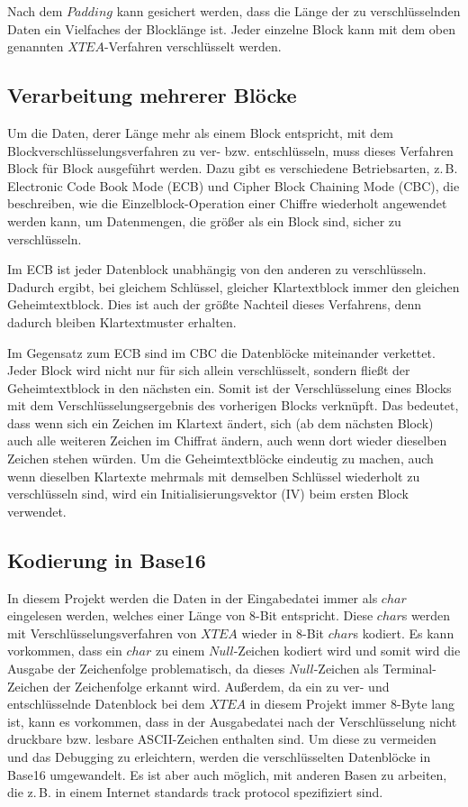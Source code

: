 \documentclass[course=erap]{aspdoc}
\begin{document}
Nach dem $Padding$ kann gesichert werden, dass die Länge der zu verschlüsselnden Daten ein Vielfaches der Blocklänge ist. Jeder einzelne Block kann mit dem oben genannten $XTEA$-Verfahren verschlüsselt werden.

\subsection{Verarbeitung mehrerer Blöcke}
Um die Daten, derer Länge mehr als einem Block entspricht, mit dem Blockverschlüsselungsverfahren zu ver- bzw. entschlüsseln, muss dieses Verfahren Block für Block ausgeführt werden. Dazu gibt es verschiedene Betriebsarten, z.\,B. Electronic Code Book Mode (ECB) und Cipher Block Chaining Mode (CBC), die beschreiben, wie die Einzelblock-Operation einer Chiffre wiederholt angewendet werden kann, um Datenmengen, die größer als ein Block sind, sicher zu verschlüsseln.

Im ECB ist jeder Datenblock unabhängig von den anderen zu verschlüsseln. Dadurch ergibt, bei gleichem Schlüssel, gleicher Klartextblock immer den gleichen Geheimtextblock. Dies ist auch der größte Nachteil dieses Verfahrens, denn dadurch bleiben Klartextmuster erhalten.

Im Gegensatz zum ECB sind im CBC die Datenblöcke miteinander verkettet. Jeder Block wird nicht nur für sich allein verschlüsselt, sondern fließt der Geheimtextblock in den nächsten ein. Somit ist der Verschlüsselung eines Blocks mit dem Verschlüsselungsergebnis des vorherigen Blocks verknüpft. Das bedeutet, dass wenn sich ein Zeichen im Klartext ändert, sich (ab dem nächsten Block) auch alle weiteren Zeichen im Chiffrat ändern, auch wenn dort wieder dieselben Zeichen stehen würden. Um die Geheimtextblöcke eindeutig zu machen, auch wenn dieselben Klartexte mehrmals mit demselben Schlüssel wiederholt zu verschlüsseln sind, wird ein Initialisierungsvektor (IV) beim ersten Block verwendet.

\subsection{Kodierung in Base16}
In diesem Projekt werden die Daten in der Eingabedatei immer als $char$ eingelesen werden, welches einer Länge von 8-Bit entspricht. Diese $char$s werden mit Verschlüsselungsverfahren von $XTEA$ wieder in 8-Bit $char$s kodiert. Es kann vorkommen, dass ein $char$ zu einem $Null$-Zeichen kodiert wird und somit wird die Ausgabe der Zeichenfolge problematisch, da dieses $Null$-Zeichen als Terminal-Zeichen der Zeichenfolge erkannt wird. Außerdem, da ein zu ver- und entschlüsselnde Datenblock bei dem $XTEA$ in diesem Projekt immer 8-Byte lang ist, kann es vorkommen, dass in der Ausgabedatei nach der Verschlüsselung nicht druckbare bzw. lesbare ASCII-Zeichen enthalten sind. Um diese zu vermeiden und das Debugging zu erleichtern, werden die verschlüsselten Datenblöcke in Base16 umgewandelt. Es ist aber auch möglich, mit anderen Basen zu arbeiten, die z.\,B. in einem Internet standards track protocol \cite{RFC4648} spezifiziert sind. 
\end{document}
